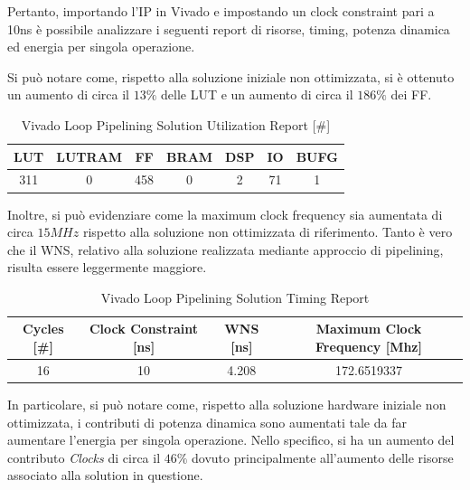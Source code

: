 Pertanto, importando l'IP in Vivado e impostando un clock constraint pari a 10ns è possibile analizzare i seguenti report di risorse, timing, potenza dinamica ed energia per singola operazione.


Si può notare come, rispetto alla soluzione iniziale non ottimizzata, si è ottenuto un aumento di circa il $13\%$ delle LUT e un aumento di circa il $186\%$ dei FF.

\begin{table}[H]
    \centering
    \begin{tabular}{|c|c|c|c|c|c|c|}
        \hline
        \textbf{LUT} & \textbf{LUTRAM} & \textbf{FF} & \textbf{BRAM} & \textbf{DSP} & \textbf{IO} & \textbf{BUFG} \\
        \hline
        311 & 0 & 458 & 0 & 2 & 71 & 1 \\
        \hline
    \end{tabular}
    \caption{Vivado Loop Pipelining Solution Utilization Report [\#]}
    \label{tab:vivado-loop-pipelining-solution-utilization-report}
\end{table}

Inoltre, si può evidenziare come la maximum clock frequency sia aumentata di circa $15 MHz$ rispetto alla soluzione non ottimizzata di riferimento. Tanto è vero che il WNS, relativo alla soluzione realizzata mediante approccio di pipelining, risulta essere leggermente maggiore.

\begin{table}[H]
    \centering
    \begin{tabular}{|c|c|c|c|}
        \hline
        \textbf{Cycles} [\#] & \textbf{Clock Constraint} [ns] & \textbf{WNS} [ns] & \textbf{Maximum Clock Frequency} [Mhz] \\
        \hline
        16 & 10 & 4.208 & 172.6519337 \\
        \hline
    \end{tabular}
    \caption{Vivado Loop Pipelining Solution Timing Report}
    \label{tab:vivado-loop-pipelining-solution-timing-report}
\end{table}

In particolare, si può notare come, rispetto alla soluzione hardware iniziale non ottimizzata, i contributi di potenza dinamica sono aumentati tale da far aumentare l'energia per singola operazione. Nello specifico, si ha un aumento del contributo \textit{Clocks} di circa il $46\%$ dovuto principalmente all'aumento delle risorse associato alla solution in questione.

